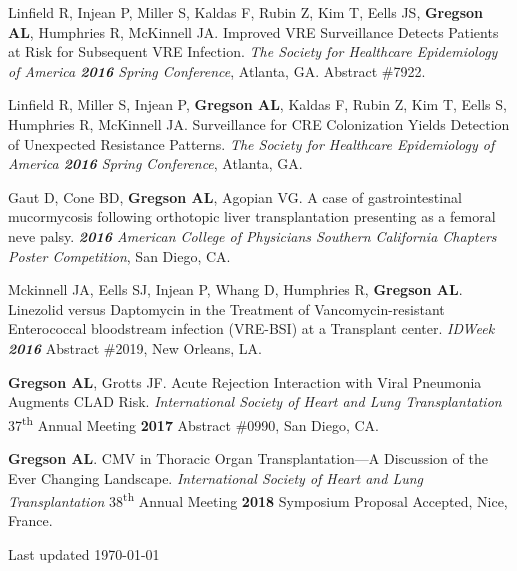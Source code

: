 \documentclass[letterpaper,10pt,sans,dvipsnames,final]{moderncv}%
\begin{document}
\begin{thebibliography}{1}
\bibitem[17]{} Linfield R, Injean P, Miller S, Kaldas F, Rubin Z, Kim T, Eells JS, \textbf{Gregson AL}, Humphries R, McKinnell JA. Improved VRE Surveillance Detects Patients at Risk for Subsequent VRE Infection. \textit{The Society for Healthcare Epidemiology of America \textbf{2016} Spring Conference}, Atlanta, GA. Abstract \#7922.

\bibitem[18]{} Linfield R, Miller S, Injean P, \textbf{Gregson AL}, Kaldas F, Rubin Z, Kim T, Eells S, Humphries R, McKinnell JA. Surveillance for CRE Colonization Yields Detection of Unexpected Resistance Patterns. \textit{The Society for Healthcare Epidemiology of America \textbf{2016} Spring Conference}, Atlanta, GA.

\bibitem[19]{} Gaut D, Cone BD, \textbf{Gregson AL}, Agopian VG. A case of gastrointestinal mucormycosis following orthotopic liver transplantation presenting as a femoral neve palsy. \textit{\textbf{2016} American College of Physicians Southern California Chapters Poster Competition}, San Diego, CA. 

\bibitem[20]{}  Mckinnell JA, Eells SJ, Injean P, Whang D, Humphries R, \textbf{Gregson AL}. Linezolid versus Daptomycin in the Treatment of Vancomycin-resistant Enterococcal bloodstream infection ({\smaller VRE-BSI}) at a Transplant center.  \textit{IDWeek \textbf{2016}} Abstract \#2019, New Orleans, LA. 

\bibitem[21]{}  \textbf{Gregson AL}, Grotts JF. Acute Rejection Interaction with Viral Pneumonia Augments CLAD Risk. \textit{International Society of Heart and Lung Transplantation} 37\textsuperscript{th} Annual Meeting \textbf{2017} Abstract \#0990, San Diego, CA.

\bibitem[22]{}  \textbf{Gregson AL}. CMV in Thoracic Organ Transplantation---A Discussion of the Ever Changing Landscape. \textit{International Society of Heart and Lung Transplantation} 38\textsuperscript{th} Annual Meeting \textbf{2018} Symposium Proposal Accepted, Nice, France.

\end{thebibliography}

\vfill

Last updated \today
\end{document}
